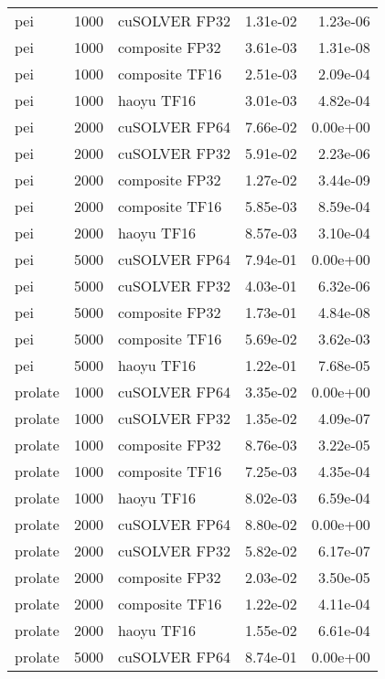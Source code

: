 \begin{table}
\begin{tabular}{lrlrr}
      pei &  1000 &  cuSOLVER FP32 &  1.31e-02 &        1.23e-06 \\
      pei &  1000 & composite FP32 &  3.61e-03 &        1.31e-08 \\
      pei &  1000 & composite TF16 &  2.51e-03 &        2.09e-04 \\
      pei &  1000 &     haoyu TF16 &  3.01e-03 &        4.82e-04 \\
      pei &  2000 &  cuSOLVER FP64 &  7.66e-02 &        0.00e+00 \\
      pei &  2000 &  cuSOLVER FP32 &  5.91e-02 &        2.23e-06 \\
      pei &  2000 & composite FP32 &  1.27e-02 &        3.44e-09 \\
      pei &  2000 & composite TF16 &  5.85e-03 &        8.59e-04 \\
      pei &  2000 &     haoyu TF16 &  8.57e-03 &        3.10e-04 \\
      pei &  5000 &  cuSOLVER FP64 &  7.94e-01 &        0.00e+00 \\
      pei &  5000 &  cuSOLVER FP32 &  4.03e-01 &        6.32e-06 \\
      pei &  5000 & composite FP32 &  1.73e-01 &        4.84e-08 \\
      pei &  5000 & composite TF16 &  5.69e-02 &        3.62e-03 \\
      pei &  5000 &     haoyu TF16 &  1.22e-01 &        7.68e-05 \\
  prolate &  1000 &  cuSOLVER FP64 &  3.35e-02 &        0.00e+00 \\
  prolate &  1000 &  cuSOLVER FP32 &  1.35e-02 &        4.09e-07 \\
  prolate &  1000 & composite FP32 &  8.76e-03 &        3.22e-05 \\
  prolate &  1000 & composite TF16 &  7.25e-03 &        4.35e-04 \\
  prolate &  1000 &     haoyu TF16 &  8.02e-03 &        6.59e-04 \\
  prolate &  2000 &  cuSOLVER FP64 &  8.80e-02 &        0.00e+00 \\
  prolate &  2000 &  cuSOLVER FP32 &  5.82e-02 &        6.17e-07 \\
  prolate &  2000 & composite FP32 &  2.03e-02 &        3.50e-05 \\
  prolate &  2000 & composite TF16 &  1.22e-02 &        4.11e-04 \\
  prolate &  2000 &     haoyu TF16 &  1.55e-02 &        6.61e-04 \\
  prolate &  5000 &  cuSOLVER FP64 &  8.74e-01 &        0.00e+00 \\

\end{tabular}
\end{table}
